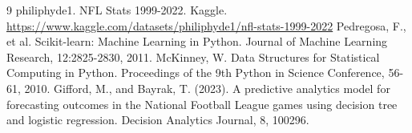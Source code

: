 \documentclass[sigconf,nonacm]{acmart}
\begin{document}
\begin{thebibliography}{9}
 philiphyde1. NFL Stats 1999-2022. Kaggle. \url{https://www.kaggle.com/datasets/philiphyde1/nfl-stats-1999-2022}
 Pedregosa, F., et al. Scikit-learn: Machine Learning in Python. Journal of Machine Learning Research, 12:2825-2830, 2011.
 McKinney, W. Data Structures for Statistical Computing in Python. Proceedings of the 9th Python in Science Conference, 56-61, 2010.
 Gifford, M., and Bayrak, T. (2023). A predictive analytics model for forecasting outcomes in the National Football League games using decision tree and logistic regression. Decision Analytics Journal, 8, 100296.
\end{thebibliography}
\end{document}
